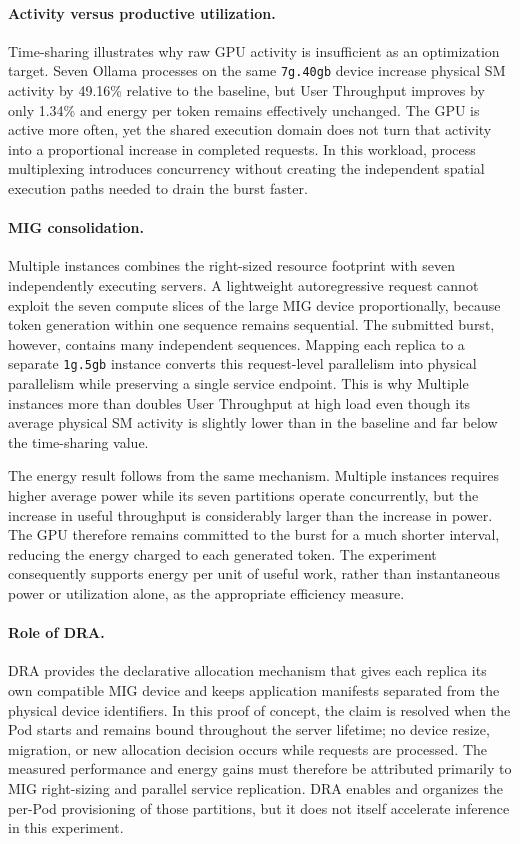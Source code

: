 \paragraph{Activity versus productive utilization.}
Time-sharing illustrates why raw GPU activity is insufficient as an optimization target. Seven Ollama processes on the same \texttt{7g.40gb} device increase physical SM activity by 49.16\% relative to the baseline, but User Throughput improves by only 1.34\% and energy per token remains effectively unchanged. The GPU is active more often, yet the shared execution domain does not turn that activity into a proportional increase in completed requests. In this workload, process multiplexing introduces concurrency without creating the independent spatial execution paths needed to drain the burst faster.

\paragraph{MIG consolidation.}
Multiple instances combines the right-sized resource footprint with seven independently executing servers. A lightweight autoregressive request cannot exploit the seven compute slices of the large MIG device proportionally, because token generation within one sequence remains sequential. The submitted burst, however, contains many independent sequences. Mapping each replica to a separate \texttt{1g.5gb} instance converts this request-level parallelism into physical parallelism while preserving a single service endpoint. This is why Multiple instances more than doubles User Throughput at high load even though its average physical SM activity is slightly lower than in the baseline and far below the time-sharing value.

The energy result follows from the same mechanism. Multiple instances requires higher average power while its seven partitions operate concurrently, but the increase in useful throughput is considerably larger than the increase in power. The GPU therefore remains committed to the burst for a much shorter interval, reducing the energy charged to each generated token. The experiment consequently supports energy per unit of useful work, rather than instantaneous power or utilization alone, as the appropriate efficiency measure.

\paragraph{Role of DRA.}
DRA provides the declarative allocation mechanism that gives each replica its own compatible MIG device and keeps application manifests separated from the physical device identifiers. In this proof of concept, the claim is resolved when the Pod starts and remains bound throughout the server lifetime; no device resize, migration, or new allocation decision occurs while requests are processed. The measured performance and energy gains must therefore be attributed primarily to MIG right-sizing and parallel service replication. DRA enables and organizes the per-Pod provisioning of those partitions, but it does not itself accelerate inference in this experiment.

